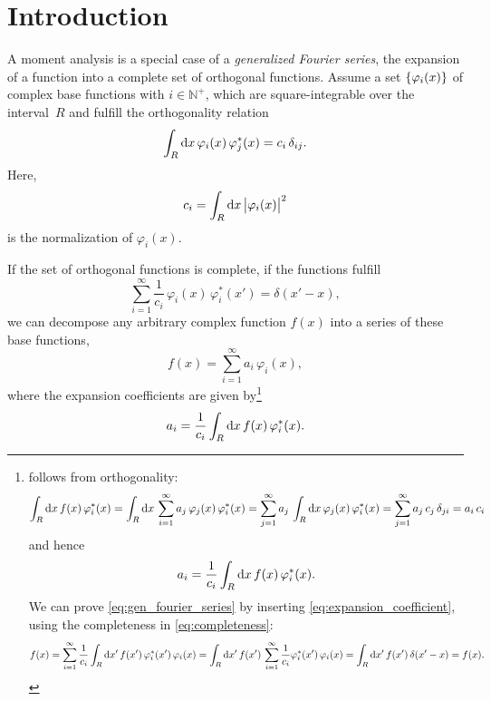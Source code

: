 \section{Introduction}%
\label{sec:introduction}

A moment analysis is a special case of a \emph{generalized Fourier
series}, \ie the expansion of a function into a complete set of
orthogonal functions.  Assume a set $\{{\varphi_i(x)}\}$ of complex
base functions with $i \in \mathbb{N}^+$, which are square-integrable
over the interval~$R$ and fulfill the orthogonality relation
\begin{equation}
  \label{eq:orthogonality}
  \int_R \dif{x}\, \varphi_i(x)\, \varphi_j^*(x)
  = c_i\, \delta_{ij}.
\end{equation}
Here,
\begin{equation}
  \label{eq:normalization}
  c_i
  = \int_R \dif{x}\, \Abs{\varphi_i(x)}^2
\end{equation}
is the normalization of $\varphi_i(x)$.

If the set of orthogonal functions is complete, \ie if the functions
fulfill
\begin{equation}
  \label{eq:completeness}
  \sum_{i = 1}^\infty \frac{1}{c_i}\, \varphi_i(x)\, \varphi_i^*(x')
  = \delta(x' - x),
\end{equation}
we can decompose any arbitrary complex function $f(x)$ into a series
of these base functions, \ie
\begin{equation}
  \label{eq:gen_fourier_series}
  f(x)
  = \sum_{i = 1}^\infty a_i\, \varphi_i(x),
\end{equation}
where the expansion coefficients are given by\footnote{%
   follows from orthogonality:
  \begin{equation*}
    \int_R \dif{x}\, f(x)\, \varphi_i^*(x)
    = \int_R \dif{x}\, \sum_{i = 1}^\infty a_j\, \varphi_j(x)\, \varphi_i^*(x)
    = \sum_{j = 1}^\infty a_j\, \int_R \dif{x}\, \varphi_j(x)\, \varphi_i^*(x)
    = \sum_{j = 1}^\infty a_j\, c_j\, \delta_{ji} = a_i\, c_i
  \end{equation*}
  and hence
  \begin{equation*}
    a_i
    = \frac{1}{c_i} \int_R \dif{x}\, f(x)\, \varphi_i^*(x).
  \end{equation*}
  We can prove \cref{eq:gen_fourier_series} by inserting
  \cref{eq:expansion_coefficient}, using the completeness in
  \cref{eq:completeness}:
  \begin{equation*}
    f(x)
    = \sum_{i = 1}^\infty \frac{1}{c_i} \int_R \dif{x'}\, f(x')\, \varphi_i^*(x')\, \varphi_i(x)
    = \int_R \dif{x'}\, f(x')\, \sum_{i = 1}^\infty \frac{1}{c_i} \varphi_i^*(x')\, \varphi_i(x)
    = \int_R \dif{x'}\, f(x')\, \delta(x' - x) = f(x).
  \end{equation*}%
}
\begin{equation}
  \label{eq:expansion_coefficient}
  a_i
  = \frac{1}{c_i} \int_R \dif{x}\, f(x)\, \varphi_i^*(x).
\end{equation}

